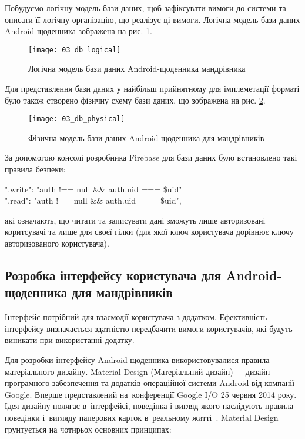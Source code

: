 \documentclass[../main.tex]{subfiles}
\begin{document}
Побудуємо логічну модель бази даних, щоб зафіксувати вимоги до системи та описати її логічну організацію, що реалізує ці вимоги. Логічна модель бази даних Android-щоденника зображена на рис. \ref{diagram:db_logical}.

\begin{figure}[H]
	\centering
	\texttt{[image: 03\_db\_logical]}
	\caption{Логічна модель бази даних Android-щоденника мандрівника}
	\label{diagram:db_logical}
\end{figure}

Для представлення бази даних у найбільш прийнятному для імплеметації форматі було також створено фізичну схему бази даних, що зображена на рис. \ref{diagram:db_physical}.

\begin{figure}[H]
	\centering
	\texttt{[image: 03\_db\_physical]}
	\caption{Фізична модель бази даних Android-щоденника для мандрівників}
	\label{diagram:db_physical}
\end{figure}

За допомогою консолі розробника Firebase для бази даних було встановлено такі правила безпеки:
\begin{center}
	".write": "auth !== null \&\& auth.uid === \$uid"\\
	".read": "auth !== null \&\& auth.uid === \$uid",
\end{center}
які означають, що читати та записувати дані зможуть лише авторизовані коритсувачі та лише для своєї гілки (для якої ключ користувача дорівнює ключу авторизованого користувача).

\subsection{Розробка інтерфейсу користувача для Android-щоденника для мандрівників}
Інтерфейс потрібний для взаємодії користувача з додатком. Ефективність інтерфейсу визначається здатністю передбачити вимоги користувачів, які будуть виникати при використанні додатку. 

Для розробки інтерфейсу Android-щоденника використовувалися правила матеріального дизайну. Material Design (Матеріальний дизайн)~--~дизайн програмного забезпечення та додатків операційної системи Android від компанії Google. Вперше представлений на~конференції Google I/O 25 червня 2014 року.  Ідея дизайну полягає в~інтерфейсі, поведінка і вигляд якого наслідують правила поведінки і~вигляду паперових карток в~реальному житті~\cite{materail_design}. Material Design грунтується на чотирьох основних принципах:
\end{document}
